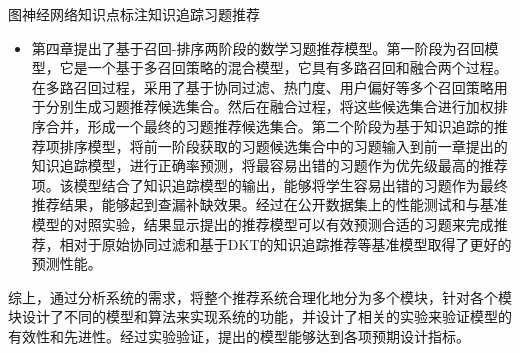 \begin{abstractC}{图神经网络}{知识点标注}{知识追踪}{习题推荐}{}
\begin{itemize}
        \item 第四章提出了基于召回-排序两阶段的数学习题推荐模型。第一阶段为召回模型，它是一个基于多召回策略的混合模型，它具有多路召回和融合两个过程。在多路召回过程，采用了基于协同过滤、热门度、用户偏好等多个召回策略用于分别生成习题推荐候选集合。然后在融合过程，将这些候选集合进行加权排序合并，形成一个最终的习题推荐候选集合。第二个阶段为基于知识追踪的推荐项排序模型，将前一阶段获取的习题候选集合中的习题输入到前一章提出的知识追踪模型，进行正确率预测，将最容易出错的习题作为优先级最高的推荐项。该模型结合了知识追踪模型的输出，能够将学生容易出错的习题作为最终推荐结果，能够起到查漏补缺效果。经过在公开数据集上的性能测试和与基准模型的对照实验，结果显示提出的推荐模型可以有效预测合适的习题来完成推荐，相对于原始协同过滤和基于DKT的知识追踪推荐等基准模型取得了更好的预测性能。
    \end{itemize}
    综上，通过分析系统的需求，将整个推荐系统合理化地分为多个模块，针对各个模块设计了不同的模型和算法来实现系统的功能，并设计了相关的实验来验证模型的有效性和先进性。经过实验验证，提出的模型能够达到各项预期设计指标。
\end{abstractC}
